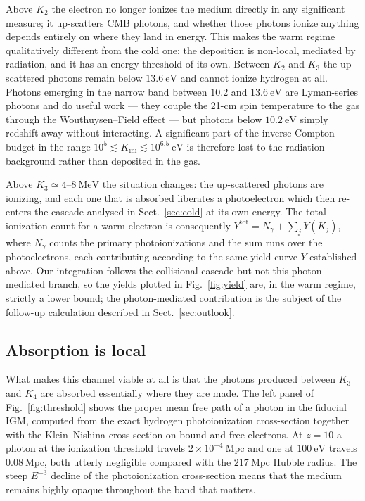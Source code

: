 \documentclass[twocolumn]{article}
\newcommand{\Kini}{K_{\mathrm{ini}}}
\begin{document}
Above $K_2$ the electron no longer ionizes the medium directly in any
significant measure; it up-scatters CMB photons, and whether those photons
ionize anything depends entirely on where they land in energy. This makes the
warm regime qualitatively different from the cold one: the deposition is
non-local, mediated by radiation, and it has an energy threshold of its own.
Between $K_2$ and $K_3$ the up-scattered photons remain below
$13.6\ \mathrm{eV}$ and cannot ionize hydrogen at all. Photons emerging in the
narrow band between $10.2$ and $13.6\ \mathrm{eV}$ are Lyman-series photons and
do useful work --- they couple the 21-cm spin temperature to the gas through
the Wouthuysen--Field effect --- but photons below $10.2\ \mathrm{eV}$ simply
redshift away without interacting. A significant part of the inverse-Compton
budget in the range $10^{5} \lesssim \Kini \lesssim 10^{6.5}\ \mathrm{eV}$ is
therefore lost to the radiation background rather than deposited in the gas.

Above $K_3 \simeq 4$--$8\ \mathrm{MeV}$ the situation changes: the up-scattered
photons are ionizing, and each one that is absorbed liberates a photoelectron
which then re-enters the cascade analysed in Sect.~\ref{sec:cold} at its own
energy. The total ionization count for a warm electron is consequently
$Y^{\mathrm{tot}} = N_\gamma + \sum_j Y(K_j)$, where $N_\gamma$ counts the
primary photoionizations and the sum runs over the photoelectrons, each
contributing according to the same yield curve $Y$ established above. Our
integration follows the collisional cascade but not this photon-mediated
branch, so the yields plotted in Fig.~\ref{fig:yield} are, in the warm regime,
strictly a lower bound; the photon-mediated contribution is
the subject of the follow-up calculation described in
Sect.~\ref{sec:outlook}.

\subsection{Absorption is local}

What makes this channel viable at all is that the photons produced between
$K_3$ and $K_4$ are absorbed essentially where they are made. The left panel of
Fig.~\ref{fig:threshold} shows the proper mean free path of a photon in the
fiducial IGM, computed from the exact hydrogen photoionization cross-section
\citep{Karzas1961} together with the Klein--Nishina cross-section on bound and
free electrons. At $z = 10$ a photon at the ionization threshold travels
$2\times10^{-4}\ \mathrm{Mpc}$ and one at $100\ \mathrm{eV}$ travels
$0.08\ \mathrm{Mpc}$, both utterly negligible compared with the
$217\ \mathrm{Mpc}$ Hubble radius. The steep $E^{-3}$ decline of the
photoionization cross-section means that the medium remains highly opaque
throughout the band that matters.
\end{document}
